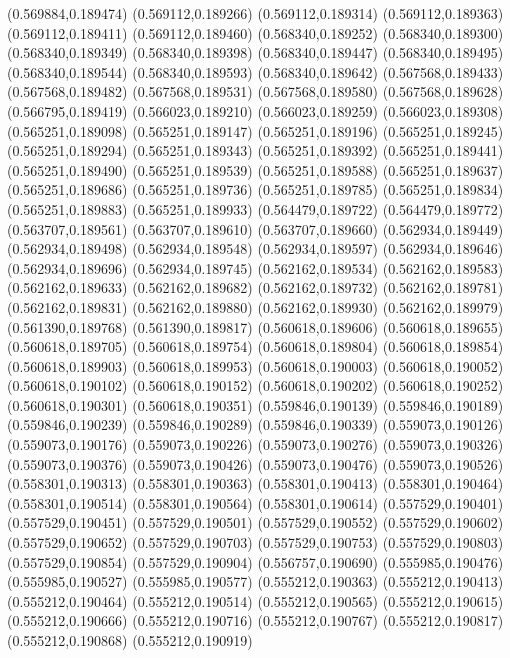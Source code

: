 (0.569884,0.189474)
(0.569112,0.189266)
(0.569112,0.189314)
(0.569112,0.189363)
(0.569112,0.189411)
(0.569112,0.189460)
(0.568340,0.189252)
(0.568340,0.189300)
(0.568340,0.189349)
(0.568340,0.189398)
(0.568340,0.189447)
(0.568340,0.189495)
(0.568340,0.189544)
(0.568340,0.189593)
(0.568340,0.189642)
(0.567568,0.189433)
(0.567568,0.189482)
(0.567568,0.189531)
(0.567568,0.189580)
(0.567568,0.189628)
(0.566795,0.189419)
(0.566023,0.189210)
(0.566023,0.189259)
(0.566023,0.189308)
(0.565251,0.189098)
(0.565251,0.189147)
(0.565251,0.189196)
(0.565251,0.189245)
(0.565251,0.189294)
(0.565251,0.189343)
(0.565251,0.189392)
(0.565251,0.189441)
(0.565251,0.189490)
(0.565251,0.189539)
(0.565251,0.189588)
(0.565251,0.189637)
(0.565251,0.189686)
(0.565251,0.189736)
(0.565251,0.189785)
(0.565251,0.189834)
(0.565251,0.189883)
(0.565251,0.189933)
(0.564479,0.189722)
(0.564479,0.189772)
(0.563707,0.189561)
(0.563707,0.189610)
(0.563707,0.189660)
(0.562934,0.189449)
(0.562934,0.189498)
(0.562934,0.189548)
(0.562934,0.189597)
(0.562934,0.189646)
(0.562934,0.189696)
(0.562934,0.189745)
(0.562162,0.189534)
(0.562162,0.189583)
(0.562162,0.189633)
(0.562162,0.189682)
(0.562162,0.189732)
(0.562162,0.189781)
(0.562162,0.189831)
(0.562162,0.189880)
(0.562162,0.189930)
(0.562162,0.189979)
(0.561390,0.189768)
(0.561390,0.189817)
(0.560618,0.189606)
(0.560618,0.189655)
(0.560618,0.189705)
(0.560618,0.189754)
(0.560618,0.189804)
(0.560618,0.189854)
(0.560618,0.189903)
(0.560618,0.189953)
(0.560618,0.190003)
(0.560618,0.190052)
(0.560618,0.190102)
(0.560618,0.190152)
(0.560618,0.190202)
(0.560618,0.190252)
(0.560618,0.190301)
(0.560618,0.190351)
(0.559846,0.190139)
(0.559846,0.190189)
(0.559846,0.190239)
(0.559846,0.190289)
(0.559846,0.190339)
(0.559073,0.190126)
(0.559073,0.190176)
(0.559073,0.190226)
(0.559073,0.190276)
(0.559073,0.190326)
(0.559073,0.190376)
(0.559073,0.190426)
(0.559073,0.190476)
(0.559073,0.190526)
(0.558301,0.190313)
(0.558301,0.190363)
(0.558301,0.190413)
(0.558301,0.190464)
(0.558301,0.190514)
(0.558301,0.190564)
(0.558301,0.190614)
(0.557529,0.190401)
(0.557529,0.190451)
(0.557529,0.190501)
(0.557529,0.190552)
(0.557529,0.190602)
(0.557529,0.190652)
(0.557529,0.190703)
(0.557529,0.190753)
(0.557529,0.190803)
(0.557529,0.190854)
(0.557529,0.190904)
(0.556757,0.190690)
(0.555985,0.190476)
(0.555985,0.190527)
(0.555985,0.190577)
(0.555212,0.190363)
(0.555212,0.190413)
(0.555212,0.190464)
(0.555212,0.190514)
(0.555212,0.190565)
(0.555212,0.190615)
(0.555212,0.190666)
(0.555212,0.190716)
(0.555212,0.190767)
(0.555212,0.190817)
(0.555212,0.190868)
(0.555212,0.190919)
